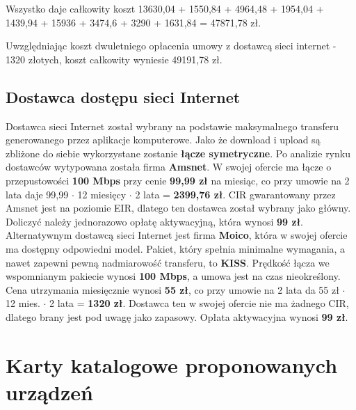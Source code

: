 \documentclass[a4paper, 12pt]{article}
\begin{document}
Wszystko daje całkowity koszt 13630,04 + 1550,84 + 4964,48 + 1954,04 + 1439,94 + 
15936 + 3474,6 + 3290 + 1631,84 = 47871,78 zł.

Uwzględniając koszt dwuletniego opłacenia umowy z dostawcą sieci internet - 1320 złotych, koszt całkowity wyniesie 49191,78 zł.

\subsection*{Dostawca dostępu sieci Internet}
\indent Dostawca sieci Internet został wybrany na podstawie maksymalnego transferu generowanego przez aplikacje komputerowe. Jako że download i upload są zbliżone do siebie wykorzystane zostanie \textbf{łącze symetryczne}.
\newline \indent Po analizie rynku dostawców wytypowana została firma \textbf{Amsnet}. W swojej ofercie ma łącze o przepustowości \textbf{100 Mbps} przy cenie \textbf{99,99 zł} na miesiąc, co przy umowie na 2 lata daje 99,99 $\cdot$ 12 miesięcy $\cdot$ 2 lata = \textbf{2399,76 zł}. CIR gwarantowany przez Amsnet jest na poziomie EIR, dlatego ten dostawca został wybrany jako główny. Doliczyć należy jednorazowo opłatę aktywacyjną, która wynosi \textbf{99 zł}.
\newline \indent Alternatywnym dostawcą sieci Internet jest firma \textbf{Moico}, która w swojej ofercie ma dostępny odpowiedni model. Pakiet, który spełnia minimalne wymagania, a nawet zapewni pewną nadmiarowość transferu, to \textbf{KISS}. Prędkość łącza we wspomnianym pakiecie wynosi \textbf{100 Mbps}, a umowa jest na czas nieokreślony. Cena utrzymania miesięcznie wynosi \textbf{55 zł}, co przy umowie na 2 lata da 55 zł $\cdot$ 12 mies. $\cdot$ 2 lata = \textbf{1320 zł}. Dostawca ten w swojej ofercie nie ma żadnego CIR, dlatego brany jest pod uwagę jako zapasowy. Opłata aktywacyjna wynosi \textbf{99 zł}.   
\section{Karty katalogowe proponowanych urządzeń}
\end{document}
